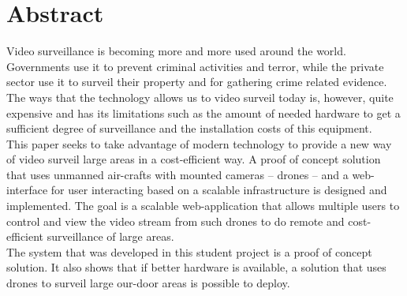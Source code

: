 \begingroup
\let\clearpage\relax
\let\cleardoublepage\relax
\let\cleardoublepage\relax

\chapter*{Abstract}
Video surveillance is becoming more and more used around the world.
Governments use it to prevent criminal activities and terror, while the private sector use it to surveil their property and for gathering crime related evidence.
The ways that the technology allows us to video surveil today is, however, quite expensive and has its limitations such as the amount of needed hardware to get a sufficient degree of surveillance and the installation costs of this equipment. \\

This paper seeks to take advantage of modern technology to provide a new way of video surveil large areas in a cost-efficient way. 
A proof of concept solution that uses unmanned air-crafts with mounted cameras -- drones -- and a web-interface for user interacting based on a scalable infrastructure is designed and implemented.
The goal is a scalable web-application that allows multiple users to control and view the video stream from such drones to do remote and cost-efficient surveillance of large areas. \\

The system that was developed in this student project is a proof of concept solution.
It also shows that if better hardware is available, a solution that uses drones to surveil large our-door areas is possible to deploy.

\endgroup			

\vfill